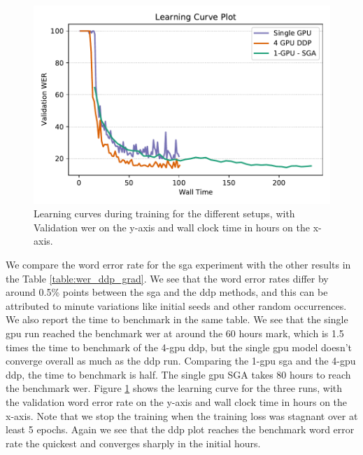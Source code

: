 \begin{figure}[ht]
  \begin{center}
    \includegraphics[width=\textwidth]{images/learning_curve_8000.pdf} 
    \caption{Learning curves during training for the different setups, with Validation \acrshort{wer} on the y-axis and wall clock time in hours on the x-axis.}
    \label{fig:learningcurve_ddp}
  \end{center}
\end{figure}

We compare the word error rate for the \acrshort{sga} experiment with the other results in the Table \ref{table:wer_ddp_grad}. We see that the word error rates differ by around 0.5\% points between the \acrshort{sga} and the \acrshort{ddp} methods, and this can be attributed to minute variations like initial seeds and other random occurrences. We also report the time to benchmark in the same table. We see that the single \acrshort{gpu} run reached the benchmark \acrshort{wer} at around the 60 hours mark, which is 1.5 times the time to benchmark of the 4-\acrshort{gpu} \acrshort{ddp}, but the single \acrshort{gpu} model doesn't converge overall as much as the \acrshort{ddp} run. Comparing the 1-\acrshort{gpu} \acrshort{sga} and the 4-\acrshort{gpu} \acrshort{ddp}, the time to benchmark is half. The single \acrshort{gpu} SGA takes 80 hours to reach the benchmark \acrshort{wer}. Figure \ref{fig:learningcurve_ddp} shows the learning curve for the three runs, with the validation word error rate on the y-axis and wall clock time in hours on the x-axis. Note that we stop the training when the training loss was stagnant over at least 5 epochs. Again we see that the \acrshort{ddp} plot reaches the benchmark word error rate the quickest and converges sharply in the initial hours. 


